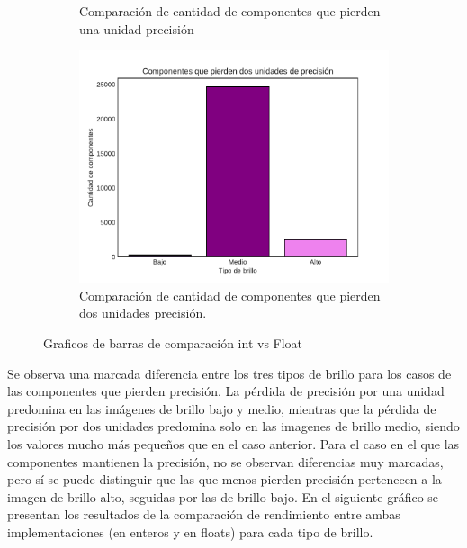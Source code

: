 \documentclass[a4paper]{article}
\begin{document}
\begin{figure}[h]
\begin{subfigure}{0.49 \textwidth}
		\caption{Comparación de cantidad de componentes que pierden una unidad precisión}
	\end{subfigure}
	\centering
	\begin{subfigure}{0.49 \textwidth}
		\includegraphics[width=\textwidth]{img/Precision2.pdf}
		\caption{Comparación de cantidad de componentes que pierden dos unidades precisión.}
	\end{subfigure}
	\caption{Graficos de barras de comparación int vs Float}
\end{figure}
\justify
Se observa una marcada diferencia entre los tres tipos de brillo para los casos de las componentes que pierden precisión. La pérdida de precisión por una unidad predomina en las imágenes de brillo bajo y medio, mientras que la pérdida de precisión por dos unidades predomina solo en las imagenes de brillo medio, siendo los valores mucho más pequeños que en el caso anterior.
\justify
Para el caso en el que las componentes mantienen la precisión, no se observan diferencias muy marcadas, pero sí se puede distinguir que las que menos pierden precisión pertenecen a la imagen de brillo alto, seguidas por las de brillo bajo.
\justify
En el siguiente gráfico se presentan los resultados de la comparación de rendimiento entre ambas implementaciones (en enteros y en floats) para cada tipo de brillo. 
\end{document}
